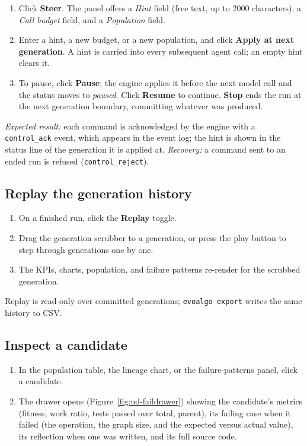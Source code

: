 \begin{enumerate}
  \item Click \textbf{Steer}. The panel offers a \emph{Hint} field (free text,
  up to 2000 characters), a \emph{Call budget} field, and a \emph{Population}
  field.
  \item Enter a hint, a new budget, or a new population, and click
  \textbf{Apply at next generation}. A hint is carried into every subsequent
  agent call; an empty hint clears it.
  \item To pause, click \textbf{Pause}; the engine applies it before the next
  model call and the status moves to \emph{paused}. Click \textbf{Resume} to
  continue. \textbf{Stop} ends the run at the next generation boundary,
  committing whatever was produced.
\end{enumerate}

\emph{Expected result:} each command is acknowledged by the engine with a
\texttt{control\_ack} event, which appears in the event log; the hint is shown
in the status line of the generation it is applied at. \emph{Recovery:} a
command sent to an ended run is refused (\texttt{control\_reject}).

\subsection{Replay the generation history}
\label{sec:ud-replay}

\begin{enumerate}
  \item On a finished run, click the \textbf{Replay} toggle.
  \item Drag the generation scrubber to a generation, or press the play button
  to step through generations one by one.
  \item The KPIs, charts, population, and failure patterns re-render for the
  scrubbed generation.
\end{enumerate}

Replay is read-only over committed generations; \texttt{evoalgo export} writes
the same history to CSV.

\subsection{Inspect a candidate}
\label{sec:ud-inspect}

\begin{enumerate}
  \item In the population table, the lineage chart, or the failure-patterns
  panel, click a candidate.
  \item The drawer opens (Figure~\ref{fig:ud-faildrawer}) showing the
  candidate's metrics (fitness, work ratio, tests passed over total, parent),
  its failing case when it failed (the operation, the graph size, and the
  expected versus actual value), its reflection when one was written, and its
  full source code.
\end{enumerate}

